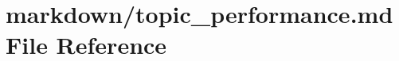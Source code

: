 \hypertarget{topic__performance_8md}{}\section{markdown/topic\+\_\+performance.md File Reference}
\label{topic__performance_8md}
